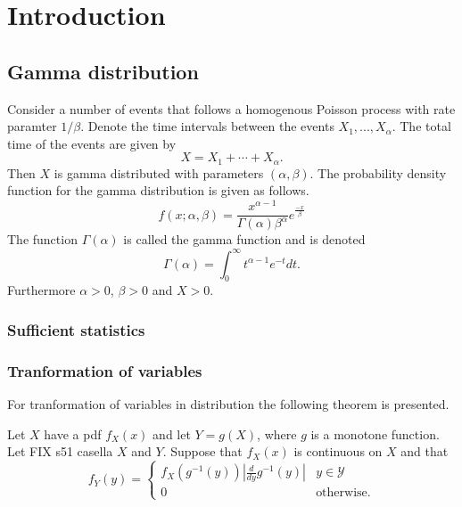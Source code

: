 \chapter{Introduction}

\section{Gamma distribution}
Consider a number of events that follows a homogenous Poisson process with rate paramter $1/\beta$. Denote the time intervals between the events $X_1,...,X_\alpha$. The total time of the events are given by
\begin{equation*}
    X = X_1 + \cdots + X_\alpha.
\end{equation*}
Then $X$ is gamma distributed with parameters $(\alpha, \beta)$. The probability density function for the gamma distribution is given as follows.
\begin{equation*}
    f(x;\alpha,\beta) = \frac{x^{\alpha - 1}}{\Gamma(\alpha)\beta^\alpha} e^{\frac{-x}{\beta}}
\end{equation*}
The function $\Gamma(\alpha)$ is called the gamma function and is denoted
\begin{equation*}
    \Gamma(\alpha) = \int_{0}^{\infty} t^{\alpha - 1} e^{-t} dt.
\end{equation*}
Furthermore $\alpha>0$, $\beta>0$ and $X>0$.

\subsection{Sufficient statistics}

\subsection{Tranformation of variables}
For tranformation of variables in distribution the following theorem is presented.
\begin{theorem}
Let $X$ have a pdf $f_X(x)$ and let $Y = g(X)$, where $g$ is a monotone function. Let FIX s51 casella $X$ and $Y$. Suppose that $f_X(x)$ is continuous on $X$ and that 
\begin{equation*}
f_Y (y) = 
\begin{cases}
f_X(g^{-1}(y)) \left| \frac{d}{dy} g^{-1}(y) \right| & y \in \mathcal{Y} \\
0 & \text{otherwise.}
\end{cases}
\end{equation*}
\end{theorem}

